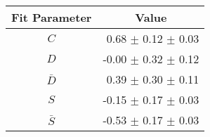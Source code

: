 \begin{tabular}{c r } 
\hline
\hline
Fit Parameter & \multicolumn{1}{c}{Value}  \\ 
\hline
$C$ & 0.68 $\pm$ 0.12 $\pm$ 0.03 \\ 
$D$ & -0.00 $\pm$ 0.32 $\pm$ 0.12 \\ 
$\bar{D}$ & 0.39 $\pm$ 0.30 $\pm$ 0.11 \\ 
$S$ & -0.15 $\pm$ 0.17 $\pm$ 0.03 \\ 
$\bar{S}$ & -0.53 $\pm$ 0.17 $\pm$ 0.03 \\ 
\hline
\hline
\end{tabular}
